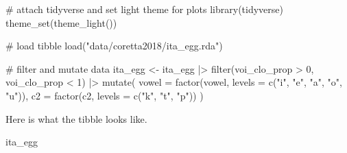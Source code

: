 \documentclass[
  authoryear,
  preprint,
  3p]{elsarticle}
\newenvironment{Shaded}{\begin{snugshade}}{\end{snugshade}}
\newcommand{\AttributeTok}[1]{\textcolor[rgb]{0.40,0.45,0.13}{#1}}
\newcommand{\CommentTok}[1]{\textcolor[rgb]{0.37,0.37,0.37}{#1}}
\newcommand{\DecValTok}[1]{\textcolor[rgb]{0.68,0.00,0.00}{#1}}
\newcommand{\FunctionTok}[1]{\textcolor[rgb]{0.28,0.35,0.67}{#1}}
\newcommand{\NormalTok}[1]{\textcolor[rgb]{0.00,0.23,0.31}{#1}}
\newcommand{\OtherTok}[1]{\textcolor[rgb]{0.00,0.23,0.31}{#1}}
\newcommand{\SpecialCharTok}[1]{\textcolor[rgb]{0.37,0.37,0.37}{#1}}
\newcommand{\StringTok}[1]{\textcolor[rgb]{0.13,0.47,0.30}{#1}}
\begin{document}
\begin{Shaded}
\begin{Highlighting}[]
\CommentTok{\# attach tidyverse and set light theme for plots}
\FunctionTok{library}\NormalTok{(tidyverse)}
\FunctionTok{theme\_set}\NormalTok{(}\FunctionTok{theme\_light}\NormalTok{())}

\CommentTok{\# load tibble}
\FunctionTok{load}\NormalTok{(}\StringTok{"data/coretta2018/ita\_egg.rda"}\NormalTok{)}

\CommentTok{\# filter and mutate data}
\NormalTok{ita\_egg }\OtherTok{\textless{}{-}}\NormalTok{ ita\_egg }\SpecialCharTok{|\textgreater{}} 
  \FunctionTok{filter}\NormalTok{(voi\_clo\_prop }\SpecialCharTok{\textgreater{}} \DecValTok{0}\NormalTok{, voi\_clo\_prop }\SpecialCharTok{\textless{}} \DecValTok{1}\NormalTok{) }\SpecialCharTok{|\textgreater{}} 
  \FunctionTok{mutate}\NormalTok{(}
    \AttributeTok{vowel =} \FunctionTok{factor}\NormalTok{(vowel, }\AttributeTok{levels =} \FunctionTok{c}\NormalTok{(}\StringTok{"i"}\NormalTok{, }\StringTok{"e"}\NormalTok{, }\StringTok{"a"}\NormalTok{, }\StringTok{"o"}\NormalTok{, }\StringTok{"u"}\NormalTok{)),}
    \AttributeTok{c2 =} \FunctionTok{factor}\NormalTok{(c2, }\AttributeTok{levels =} \FunctionTok{c}\NormalTok{(}\StringTok{"k"}\NormalTok{, }\StringTok{"t"}\NormalTok{, }\StringTok{"p"}\NormalTok{))}
\NormalTok{  )}
\end{Highlighting}
\end{Shaded}

Here is what the tibble looks like.

\begin{Shaded}
\begin{Highlighting}[]
\NormalTok{ita\_egg}
\end{Highlighting}
\end{Shaded}
\end{document}
